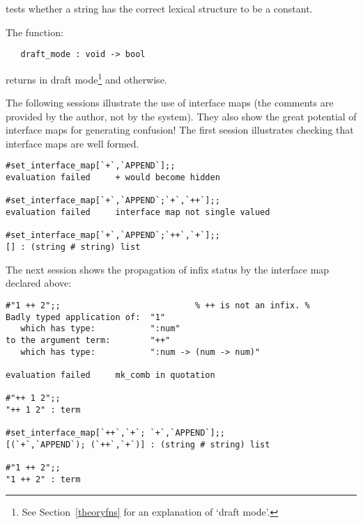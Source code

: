 {{\noindent tests whether a string has the correct lexical structure to be a 
constant.

The function:

\begin{boxed}
\begin{verbatim}
   draft_mode : void -> bool
\end{verbatim}\end{boxed}

\noindent returns  in draft mode\footnote{See Section~\ref{theoryfns}
for an explanation of `draft mode'.} and  otherwise.

The following sessions illustrate the use of interface maps (the comments are
provided by the author, not by the system). They
also show the great potential of interface maps for
generating confusion! The first session illustrates checking that
interface maps are well formed.

\setcounter{sessioncount}{1}
\begin{session}\begin{verbatim}
#set_interface_map[`+`,`APPEND`];;
evaluation failed     + would become hidden 

#set_interface_map[`+`,`APPEND`;`+`,`++`];;
evaluation failed     interface map not single valued 

#set_interface_map[`+`,`APPEND`;`++`,`+`];;
[] : (string # string) list
\end{verbatim}\end{session}

\noindent The next session shows the propagation of infix status by the interface map declared above:

\begin{session}\begin{verbatim}
#"1 ++ 2";;                           % ++ is not an infix. %
Badly typed application of:  "1"
   which has type:           ":num"
to the argument term:        "++"
   which has type:           ":num -> (num -> num)"

evaluation failed     mk_comb in quotation 

#"++ 1 2";;
"++ 1 2" : term

#set_interface_map[`++`,`+`; `+`,`APPEND`];;
[(`+`,`APPEND`); (`++`,`+`)] : (string # string) list

#"1 ++ 2";;
"1 ++ 2" : term
\end{verbatim}\end{session}

}}
